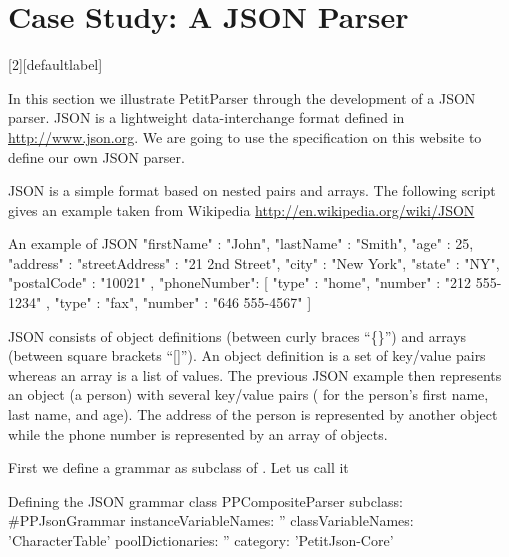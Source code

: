 \documentclass[a4paper,10pt,twoside]{book}
\begin{document}
\section{Case Study: A JSON Parser}

[2][defaultlabel]{%
\renewcommand{\lstlistingname}{Script}%
}{}
\newcommand{\syntaxjsonref}[1]{\figref{syntax-json-#1}}
\newcommand{\tikzgrammarjsonfig}[2]{%
  \begin{figure}
    \centering
    \tikzgrammar{#2}
    \caption{Syntax diagram representation for the JSON #1 parser defined in \scrref{json-#1}}
\label{fig:syntax-json-#1}
\end{figure}
}

In this section we illustrate PetitParser through the development of a JSON 
parser. JSON is a lightweight data-interchange format defined in 
\url{http://www.json.org}. We are going to use the specification on this 
website to define our own JSON parser.

JSON is a simple format based on nested pairs and arrays. The
following script gives an example taken from Wikipedia
\url{http://en.wikipedia.org/wiki/JSON}

\begin{script}{An example of JSON}
{	"firstName" : "John",
	"lastName" : "Smith",
	"age" : 25,
	"address" :
  		{ 	"streetAddress" : "21 2nd Street",
			"city" : "New York",
		    "state" : "NY",
		    "postalCode" : "10021"	},
	"phoneNumber":
  		[
			{	"type" : "home",
		      	"number" : "212 555-1234"	},
			{	"type" : "fax",
				"number" : "646 555-4567"	}	]	}
\end{script}


JSON consists of object definitions (between curly braces ``\{\}'')
and arrays (between square brackets ``[]''). An object definition is a
set of key/value pairs whereas an array is a list of values. The
previous JSON example then represents an object (a person) with
several key/value pairs (\eg{} for the person's first name, last name,
and age). The address of the person is represented by another object
while the phone number is represented by an array of objects.


First we define a grammar as subclass of . Let us call it

\begin{script}{Defining the JSON grammar class}
PPCompositeParser subclass: #PPJsonGrammar
  instanceVariableNames: ''
  classVariableNames: 'CharacterTable'
  poolDictionaries: ''
  category: 'PetitJson-Core'
\end{script}
\end{document}
